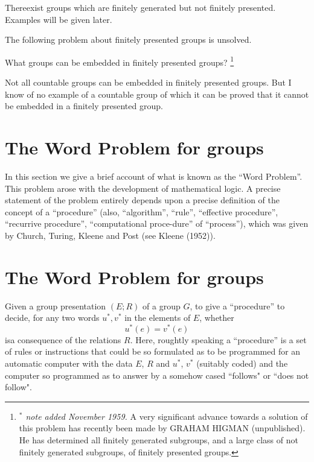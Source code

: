 There\pageoriginale exist groups which are finitely generated but not finitely
presented. Examples will be given later. 

The following problem about finitely presented groups is unsolved.

\begin{prob*}
  What groups can be embedded in finitely presented groups? 
  \footnote{\textit{$^*$ note added November 1959.} A very
    significant advance towards a solution of this problem has
    recently been made by GRAHAM HIGMAN (unpublished). He has
    determined all finitely generated subgroups, and a large class of
    not finitely generated subgroups, of finitely presented groups.}  
\end{prob*}

\noindent Not all countable groups can be embedded in finitely presented
groups. But I know of no example of a countable group of which it can
be proved that it cannot be embedded in a finitely presented group. 

\section{The Word Problem for groups}\label{chap2:sec7}%

In this section we give a brief account of what is known as the ``Word
Problem''. This problem arose with the development of mathematical
logic. A precise statement of the problem entirely depends upon a
precise definition of the concept of a ``procedure'' (also,
``algorithm'', ``rule'', ``effective procedure'', ``recurrive procedure'',
``computational proce-\break dure'' of ``process''), which was given by Church,
Turing, Kleene and Post (see Kleene (1952)). 

\section*{The Word Problem for groups}

Given a group presentation $(E ; R)$ of a group $G$, to give a
``procedure'' to decide, for any two words $u^*, v^*$ in the elements
of $E$, whether
$$
u^*(e) = v^*(e)
$$
is\pageoriginale a consequence of the relations $R$. Here, roughtly speaking a
``procedure'' is a set of rules or instructions that could be so
formulated as to be programmed for an automatic computer with the data
$E$, $R$ and $u^*$, $v^*$ (suitably coded) and the computer so
programmed as to answer by a somehow cased ``follows" or ``does not
follow". 

